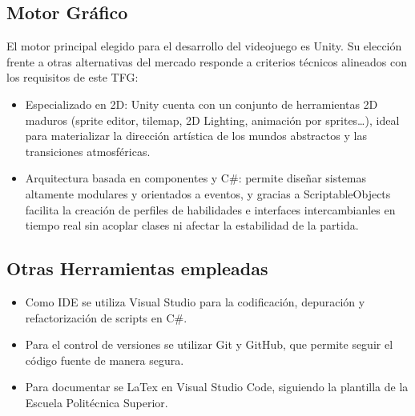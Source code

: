 \subsection{Motor Gráfico}
El motor principal elegido para el desarrollo del videojuego es Unity. Su elección frente a otras alternativas del mercado responde a criterios técnicos alineados con los requisitos de este TFG:
\begin{itemize}
    \item Especializado en 2D: Unity cuenta con un conjunto de herramientas 2D maduros (sprite editor, tilemap, 2D Lighting, animación por sprites…), ideal para materializar la dirección artística de los mundos abstractos y las transiciones atmosféricas.
    \item Arquitectura basada en componentes y C\#: permite diseñar sistemas altamente modulares y orientados a eventos, y gracias a ScriptableObjects facilita la creación de perfiles de habilidades e interfaces intercambianles en tiempo real sin acoplar clases ni afectar la estabilidad de la partida.
\end{itemize}
\subsection{Otras Herramientas empleadas}
\begin{itemize}
    \item Como IDE se utiliza Visual Studio para la codificación, depuración y refactorización de scripts en C\#.
    \item Para el control de versiones se utilizar Git y GitHub, que permite seguir el código fuente de manera segura.
    \item Para documentar se LaTex en Visual Studio Code, siguiendo la plantilla de la Escuela Politécnica Superior.
\end{itemize}